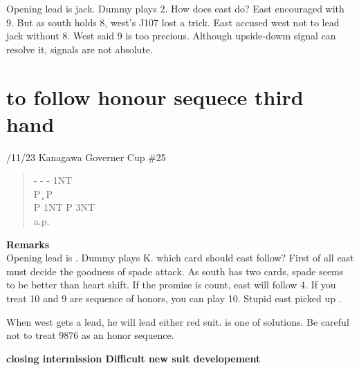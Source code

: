 Opening lead is jack. Dummy plays 2. How does east do?
East encouraged with 9. But as south holds 8,
west's J107 lost a trick. East accused west not to
lead jack without 8. West said 9  is too 
precious. Although upside-dowm signal can resolve it,
signals are not absolute. 


\section{to follow honour sequece third hand}

/11/23 Kanagawa Governer Cup \#25
\begin{quote}
%
  {}%
  {}
  {}%
  {}%
\end{quote}
\begin{quote}
\begin{bidding}
-  \> -  \> -  \> 1NT \\
P \c \> P \d \\
P \> 1NT \> P \> 3NT \\
a.p.
\end{bidding}
\end{quote}

{\bf Remarks}\\


Opening lead is . Dummy plays \s K. which
card should east follow?
First of all east must decide the goodness of spade attack.
As south has two cards, spade seems to be better than heart shift.
If the promise is count, east will follow 4.
If you treat 10 and 9 are sequence of honors, you can play 10.
Stupid east picked up .

When west gets a lead, he will lead either red suit.
 is one of solutions. Be careful not to treat
9876 as an honor sequence.




\vspace{0.5cm}
{\bf closing intermission Difficult new suit developement}\\


